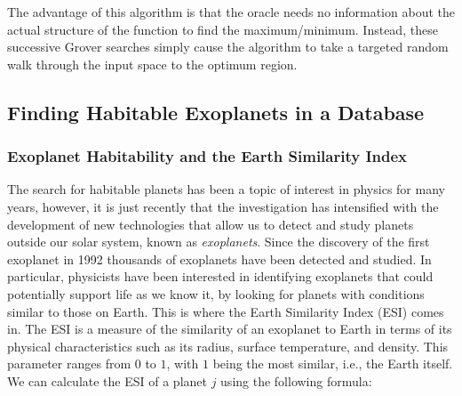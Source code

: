 \documentclass{article}[11pt]
\begin{document}
The advantage of this algorithm is that the oracle needs no information about the actual structure of the function to find the maximum/minimum.\cite{baritompa} Instead, these successive Grover searches simply cause the algorithm to take a targeted random walk through the input space to the optimum region.
\begin{figure}[H]
\end{figure}

\subsection{Finding Habitable Exoplanets in a Database}
\subsubsection{Exoplanet Habitability and the Earth Similarity Index}
The search for habitable planets has been a topic of interest in physics for many years, however, it is just recently that the investigation has intensified with the development of new technologies that allow us to detect and study planets outside our solar system, known as \textit{exoplanets}. Since the discovery of the first exoplanet in 1992\cite{exoplanet} thousands of exoplanets have been detected and studied. In particular, physicists have been interested in identifying exoplanets that could potentially support life as we know it, by looking for planets with conditions similar to those on Earth. This is where the Earth Similarity Index (ESI) comes in.
The ESI is a measure of the similarity of an exoplanet to Earth in terms of its physical characteristics such as its radius, surface temperature, and density.\cite{ESIpaper} This parameter ranges from $0$ to $1$, with $1$ being the most similar, i.e., the Earth itself.  We can calculate the ESI of a planet $j$ using the following formula:
\end{document}
